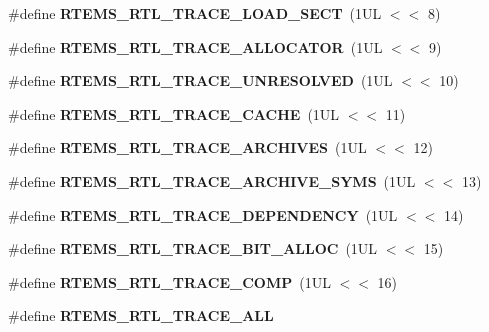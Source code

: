 \begin{DoxyCompactItemize}
\#define {\bfseries R\+T\+E\+M\+S\+\_\+\+R\+T\+L\+\_\+\+T\+R\+A\+C\+E\+\_\+\+L\+O\+A\+D\+\_\+\+S\+E\+CT}~(1\+U\+L $<$$<$ 8)
\item 
\mbox{\label{rtl-trace_8h_a90176e2e2f622d1bd09dad328d798cf3}} 
\#define {\bfseries R\+T\+E\+M\+S\+\_\+\+R\+T\+L\+\_\+\+T\+R\+A\+C\+E\+\_\+\+A\+L\+L\+O\+C\+A\+T\+OR}~(1\+U\+L $<$$<$ 9)
\item 
\mbox{\label{rtl-trace_8h_a5963d4ef61c5a06329b48581877ae08b}} 
\#define {\bfseries R\+T\+E\+M\+S\+\_\+\+R\+T\+L\+\_\+\+T\+R\+A\+C\+E\+\_\+\+U\+N\+R\+E\+S\+O\+L\+V\+ED}~(1\+U\+L $<$$<$ 10)
\item 
\mbox{\label{rtl-trace_8h_a741f8d2a92069c7b43296caec3321110}} 
\#define {\bfseries R\+T\+E\+M\+S\+\_\+\+R\+T\+L\+\_\+\+T\+R\+A\+C\+E\+\_\+\+C\+A\+C\+HE}~(1\+U\+L $<$$<$ 11)
\item 
\mbox{\label{rtl-trace_8h_a5765728d91c9d6bf0b45339f7b4ba484}} 
\#define {\bfseries R\+T\+E\+M\+S\+\_\+\+R\+T\+L\+\_\+\+T\+R\+A\+C\+E\+\_\+\+A\+R\+C\+H\+I\+V\+ES}~(1\+U\+L $<$$<$ 12)
\item 
\mbox{\label{rtl-trace_8h_a6db6e5223cd41402bc145a6e47cbe427}} 
\#define {\bfseries R\+T\+E\+M\+S\+\_\+\+R\+T\+L\+\_\+\+T\+R\+A\+C\+E\+\_\+\+A\+R\+C\+H\+I\+V\+E\+\_\+\+S\+Y\+MS}~(1\+U\+L $<$$<$ 13)
\item 
\mbox{\label{rtl-trace_8h_a076aeb33f0a3771960172f445992c2ae}} 
\#define {\bfseries R\+T\+E\+M\+S\+\_\+\+R\+T\+L\+\_\+\+T\+R\+A\+C\+E\+\_\+\+D\+E\+P\+E\+N\+D\+E\+N\+CY}~(1\+U\+L $<$$<$ 14)
\item 
\mbox{\label{rtl-trace_8h_a8ac9abbac1ab2004d63c043c43ecc582}} 
\#define {\bfseries R\+T\+E\+M\+S\+\_\+\+R\+T\+L\+\_\+\+T\+R\+A\+C\+E\+\_\+\+B\+I\+T\+\_\+\+A\+L\+L\+OC}~(1\+U\+L $<$$<$ 15)
\item 
\mbox{\label{rtl-trace_8h_a53cc117c5d41fa6f1efc62eeafe8dbde}} 
\#define {\bfseries R\+T\+E\+M\+S\+\_\+\+R\+T\+L\+\_\+\+T\+R\+A\+C\+E\+\_\+\+C\+O\+MP}~(1\+U\+L $<$$<$ 16)
\item 
\#define {\bfseries R\+T\+E\+M\+S\+\_\+\+R\+T\+L\+\_\+\+T\+R\+A\+C\+E\+\_\+\+A\+LL}
\end{DoxyCompactItemize}
